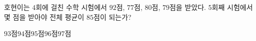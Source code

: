 호현이는 $4$회에 걸친 수학 시험에서 $92$점, $77$점, $80$점, $79$점을 받았다. $5$회째 시험에서 몇 점을 받아야 전체 평균이 $85$점이 되는가?
\begin{choices32}{$93$점}{$94$점}{$95$점}{$96$점}{$97$점}\end{choices32}
